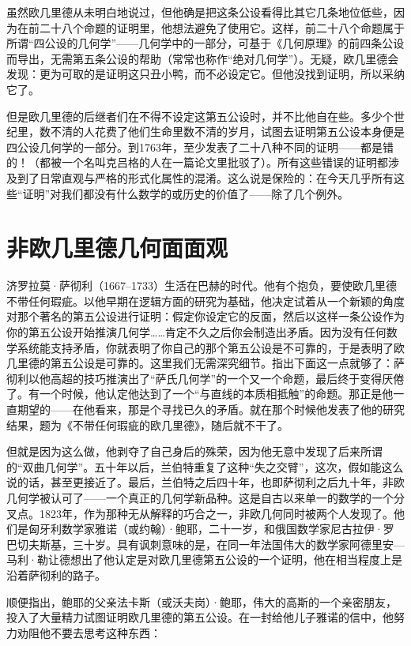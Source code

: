 虽然欧几里德从未明白地说过，但他确是把这条公设看得比其它几条地位低些，因为在前二十八个命题的证明里，他想法避免了使用它。这样，前二十八个命题属于所谓“四公设的几何学”——几何学中的一部分，可基于《几何原理》的前四条公设而导出，无需第五条公设的帮助（常常也称作“绝对几何学”）。无疑，欧几里德会发现：更为可取的是证明这只丑小鸭，而不必设定它。但他没找到证明，所以采纳它了。

但是欧几里德的后继者们在不得不设定这第五公设时，并不比他自在些。多少个世纪里，数不清的人花费了他们生命里数不清的岁月，试图去证明第五公设本身便是四公设几何学的一部分。到1763年，至少发表了二十八种不同的证明——都是错的！（都被一个名叫克吕格的人在一篇论文里批驳了）。所有这些错误的证明都涉及到了日常直观与严格的形式化属性的混淆。这么说是保险的：在今天几乎所有这些“证明”对我们都没有什么数学的或历史的价值了——除了几个例外。

\section{非欧几里德几何面面观}

济罗拉莫·萨彻利（1667--1733）生活在巴赫的时代。他有个抱负，要使欧几里德不带任何瑕疵。以他早期在逻辑方面的研究为基础，他决定试着从一个新颖的角度对那个著名的第五公设进行证明：假定你设定它的反面，然后以这样一条公设作为你的第五公设开始推演几何学……肯定不久之后你会制造出矛盾。因为没有任何数学系统能支持矛盾，你就表明了你自己的那个第五公设是不可靠的，于是表明了欧几里德的第五公设是可靠的。这里我们无需深究细节。指出下面这一点就够了：萨彻利以他高超的技巧推演出了“萨氏几何学”的一个又一个命题，最后终于变得厌倦了。有一个时候，他认定他达到了一个“与直线的本质相抵触”的命题。那正是他一直期望的——在他看来，那是个寻找已久的矛盾。就在那个时候他发表了他的研究结果，题为《不带任何瑕疵的欧几里德》，随后就不干了。

但就是因为这么做，他剥夺了自己身后的殊荣，因为他无意中发现了后来所谓的“双曲几何学”。五十年以后，兰伯特重复了这种“失之交臂”，这次，假如能这么说的话，甚至更接近了。最后，兰伯特之后四十年，也即萨彻利之后九十年，非欧几何学被认可了——一个真正的几何学新品种。这是自古以来单一的数学的一个分叉点。1823年，作为那种无从解释的巧合之一，非欧几何同时被两个人发现了。他们是匈牙利数学家雅诺（或约翰）·鲍耶，二十一岁，和俄国数学家尼古拉伊·罗巴切夫斯基，三十岁。具有讽刺意味的是，在同一年法国伟大的数学家阿德里安—马利·勒让德想出了他认定是对欧几里德第五公设的一个证明，他在相当程度上是沿着萨彻利的路子。

顺便指出，鲍耶的父亲法卡斯（或沃夫岗）·鲍耶，伟大的高斯的一个亲密朋友，投入了大量精力试图证明欧几里德的第五公设。在一封给他儿子雅诺的信中，他努力劝阻他不要去思考这种东西：


